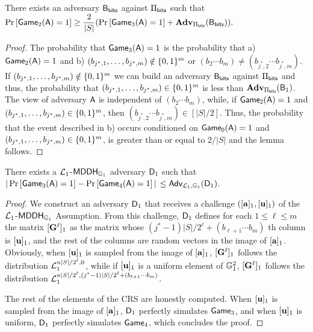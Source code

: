 \begin{lemma} There exists an adversary $\mathsf{B}_{\mathsf{bits}}$ against $\Pi_{\mathsf{bits}}$ such that
$\Pr\left[ \mathsf{Game}_2(\mathsf{A})=1\right]\geq\dfrac{2}{|S|}(\Pr\left[\mathsf{Game}_3(\mathsf{A})=1\right]+\mathbf{Adv}_{\Pi_{\mathsf{bits}}}(\mathsf{B}_{\mathsf{bits}})).$
\end{lemma}

\begin{proof}  The probability that
 $\mathsf{Game}_3(\mathsf{A})=1$ is the probability that  a) $\mathsf{Game}_2(\mathsf{A})=1$ and
b) $(b_{j^*,1},\ldots,b_{j^*,m})\notin\{0,1\}^m$ or $(b_2\cdots b_m) \neq (b_{j^*,2}\cdots b_{j^*,m})$. If $(b_{j^*,1},\ldots,b_{j^*,m})\notin\{0,1\}^m$ we can build an adversary $\mathsf{B}_{\mathsf{bits}}$ against $\Pi_{\mathsf{bits}}$ and thus, the probability that $(b_{j^*,1},\ldots,b_{j^*,m})\in\{0,1\}^m$ is less than $\mathbf{Adv}_{\Pi_{\mathsf{bits}}}(\mathsf{B}_1)$. The view of adversary $\mathsf{A}$ is independent of $(b_{2}\cdots b_{m})$, while, if $\mathsf{Game_2}(\mathsf{A})=1$ and $(b_{j^*,1},\ldots,b_{j^*,m})\in\{0,1\}^{m}$, then $(b_{j^*,2}\cdots b_{j^*,m})\in[|S|/2]$. Thus, 
the probability that the event described in b) occurs conditioned on $\mathsf{Game_0}(\mathsf{A})=1$ and $(b_{j^*,1},\ldots,b_{j^*,m})\in\{0,1\}^{m}$, is greater than or equal to $2/|S|$ and the lemma follows.
\end{proof}

\begin{lemma} There exists a $\mathcal{L}_1$-$\mathsf{MDDH}_{\mathbb{G}_1}$ adversary $\mathsf{D}_1$ such that
$|\Pr\left[\mathsf{Game}_{3}(\mathsf{A})=1\right]\allowbreak-\Pr\left[\mathsf{Game}_{4}(\mathsf{A})=1\right]|$ $\leq
    \mathsf{Adv}_{\mathcal{L}_1,\mathbb{G}_1}(\mathsf{D}_1).$
\label{lemma:bits2}
\end{lemma}

\begin{proof}
We construct an adversary $\mathsf{D}_1$ that receives 
a challenge $([\mathbf{a}]_1,[\mathbf{u}]_1)$ of the 
$\mathcal{L}_1$-$\mathsf{MDDH}_{\mathbb{G}_1}$ Assumption. From this challenge, $\mathsf{D}_1$ defines for each $1\leq\ell\leq m$ the matrix  $[\mathbf{{G}}^\ell]_1$ as the matrix whose  $(j^*-1)|S|/2^\ell+(b_{\ell+1}\cdots b_m)$ th column is $[\mathbf{u}]_1$, and the rest of the columns are random vectors in the image of $[\mathbf{a}]_1$. 
Obviously, when $[\mathbf{u}]_1$ is sampled from 
the image of $[\mathbf{a}]_1$, $[\mathbf{{G}}^\ell]_1$ follows the distribution $\mathcal{L}_1^{n|S|/2^\ell,0}$, while if $[\mathbf{u}]_1$ is a uniform element of $\mathbb{G}^2_1$, $[\mathbf{{G}}^\ell]_1$ follows the distribution $\mathcal{L}_1^{n|S|/2^\ell,(j^*-1)|S|/2^\ell+(b_{\ell+1}\cdots b_m)}$. 
 
The rest of the elements of the CRS are honestly computed. When $[\mathbf{u}]_1$ is sampled from the image of $[\mathbf{{a}}]_1$, $\mathsf{D}_1$ perfectly simulates $\mathsf{Game}_3$, and when $[\mathbf{u}]_1$ is uniform, $\mathsf{D}_1$ perfectly simulates $\mathsf{Game}_4$, which concludes the proof. 
\end{proof}


